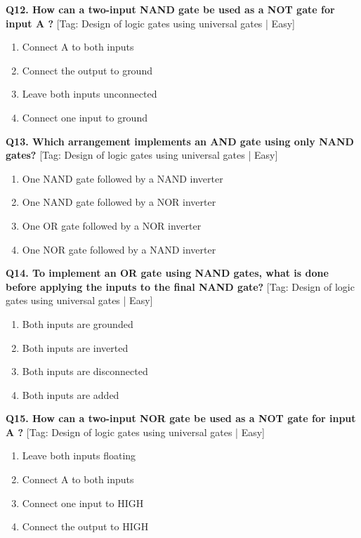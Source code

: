 \noindent\textbf{Q12. How can a two-input NAND gate be used as a NOT gate for input A ?} \hfill [Tag: Design of logic gates using universal gates | Easy]
\begin{enumerate}[label=(\alph*),topsep=2pt,itemsep=1pt,partopsep=0pt,parsep=0pt]
    \item {Connect A to both inputs}
    \item {Connect the output to ground}
    \item {Leave both inputs unconnected}
    \item {Connect one input to ground}
\end{enumerate}
\vspace{2mm}

\noindent\textbf{Q13. Which arrangement implements an AND gate using only NAND gates?} \hfill [Tag: Design of logic gates using universal gates | Easy]
\begin{enumerate}[label=(\alph*),topsep=2pt,itemsep=1pt,partopsep=0pt,parsep=0pt]
    \item {One NAND gate followed by a NAND inverter}
    \item {One NAND gate followed by a NOR inverter}
    \item {One OR gate followed by a NOR inverter}
    \item {One NOR gate followed by a NAND inverter}
\end{enumerate}
\vspace{2mm}

\noindent\textbf{Q14. To implement an OR gate using NAND gates, what is done before applying the inputs to the final NAND gate?} \hfill [Tag: Design of logic gates using universal gates | Easy]
\begin{enumerate}[label=(\alph*),topsep=2pt,itemsep=1pt,partopsep=0pt,parsep=0pt]
    \item {Both inputs are grounded}
    \item {Both inputs are inverted}
    \item {Both inputs are disconnected}
    \item {Both inputs are added}
\end{enumerate}
\vspace{2mm}

\noindent\textbf{Q15. How can a two-input NOR gate be used as a NOT gate for input A ?} \hfill [Tag: Design of logic gates using universal gates | Easy]
\begin{enumerate}[label=(\alph*),topsep=2pt,itemsep=1pt,partopsep=0pt,parsep=0pt]
    \item {Leave both inputs floating}
    \item {Connect A to both inputs}
    \item {Connect one input to HIGH}
    \item {Connect the output to HIGH}
\end{enumerate}
\vspace{2mm}

